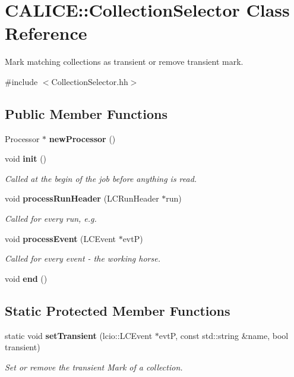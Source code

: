 \section{CALICE::CollectionSelector Class Reference}
\label{classCALICE_1_1CollectionSelector}


Mark matching collections as transient or remove transient mark.  


{\ttfamily \#include $<$CollectionSelector.hh$>$}\subsection*{Public Member Functions}
\begin{DoxyCompactItemize}
\item 
Processor $\ast$ {\bfseries newProcessor} ()\label{classCALICE_1_1CollectionSelector_abc7ca774dc191ae2c2e437d6932513ca}

\item 
void {\bf init} ()
\begin{DoxyCompactList}\small\item\em Called at the begin of the job before anything is read. \item\end{DoxyCompactList}\item 
void {\bf processRunHeader} (LCRunHeader $\ast$run)
\begin{DoxyCompactList}\small\item\em Called for every run, e.g. \item\end{DoxyCompactList}\item 
void {\bf processEvent} (LCEvent $\ast$evtP)\label{classCALICE_1_1CollectionSelector_a7fae16a6069ad23c39f9ea1498229f96}

\begin{DoxyCompactList}\small\item\em Called for every event -\/ the working horse. \item\end{DoxyCompactList}\item 
void {\bfseries end} ()\label{classCALICE_1_1CollectionSelector_a22ff69b0e61dada140f07cba6b1da38d}

\end{DoxyCompactItemize}
\subsection*{Static Protected Member Functions}
\begin{DoxyCompactItemize}
\item 
static void {\bf setTransient} (lcio::LCEvent $\ast$evtP, const std::string \&name, bool transient)
\begin{DoxyCompactList}\small\item\em Set or remove the transient Mark of a collection. \item\end{DoxyCompactList}\end{DoxyCompactItemize}
